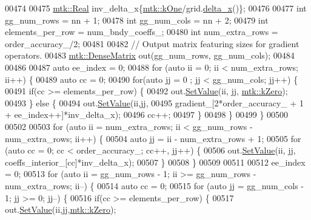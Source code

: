 \begin{DoxyCode}
{{00474 
00475   \hyperlink{group__c01-roots_gac080bbbf5cbb5502c9f00405f894857d}{mtk::Real} inv\_delta\_x\{\hyperlink{group__c01-roots_ga26407c24d43b6b95480943340d285c71}{mtk::kOne}/grid.\hyperlink{classmtk_1_1UniStgGrid1D_a6e7173b01241632cf509496d66b9f74c}{delta\_x}()\};
00476 
00477   \textcolor{keywordtype}{int} gg\_num\_rows = nn + 1;
00478   \textcolor{keywordtype}{int} gg\_num\_cols = nn + 2;
00479   \textcolor{keywordtype}{int} elements\_per\_row = num\_bndy\_coeffs\_;
00480   \textcolor{keywordtype}{int} num\_extra\_rows = order\_accuracy\_/2;
00481 
00482   \textcolor{comment}{// Output matrix featuring sizes for gradient operators.}
00483   \hyperlink{classmtk_1_1DenseMatrix}{mtk::DenseMatrix} out(gg\_num\_rows, gg\_num\_cols);
00484 
00486 
00487   \textcolor{keyword}{auto} ee\_index = 0;
00488   \textcolor{keywordflow}{for} (\textcolor{keyword}{auto} ii = 0; ii < num\_extra\_rows; ii++) \{
00489     \textcolor{keyword}{auto} cc = 0;
00490     \textcolor{keywordflow}{for}(\textcolor{keyword}{auto} jj = 0 ; jj < gg\_num\_cols; jj++) \{
00491       \textcolor{keywordflow}{if}(cc >= elements\_per\_row) \{
00492         out.\hyperlink{classmtk_1_1DenseMatrix_a784ce5784109ac86bfb9d8562b334b13}{SetValue}(ii, jj, \hyperlink{group__c01-roots_ga59a451a5fae30d59649bcda274fea271}{mtk::kZero});
00493       \} \textcolor{keywordflow}{else} \{
00494         out.\hyperlink{classmtk_1_1DenseMatrix_a784ce5784109ac86bfb9d8562b334b13}{SetValue}(ii,jj,
00495                      gradient\_[2*order\_accuracy\_ + 1 + ee\_index++]*inv\_delta\_x);
00496         cc++;
00497       \}
00498     \}
00499   \}
00500 
00502 
00503   \textcolor{keywordflow}{for} (\textcolor{keyword}{auto} ii = num\_extra\_rows; ii < gg\_num\_rows - num\_extra\_rows; ii++) \{
00504     \textcolor{keyword}{auto} jj = ii - num\_extra\_rows + 1;
00505     \textcolor{keywordflow}{for} (\textcolor{keyword}{auto} cc = 0; cc < order\_accuracy\_; cc++, jj++) \{
00506       out.\hyperlink{classmtk_1_1DenseMatrix_a784ce5784109ac86bfb9d8562b334b13}{SetValue}(ii, jj, coeffs\_interior\_[cc]*inv\_delta\_x);
00507     \}
00508   \}
00509 
00511 
00512   ee\_index = 0;
00513   \textcolor{keywordflow}{for} (\textcolor{keyword}{auto} ii = gg\_num\_rows - 1; ii >= gg\_num\_rows - num\_extra\_rows; ii--) \{
00514     \textcolor{keyword}{auto} cc = 0;
00515     \textcolor{keywordflow}{for} (\textcolor{keyword}{auto} jj = gg\_num\_cols - 1; jj >= 0; jj--) \{
00516       \textcolor{keywordflow}{if}(cc >= elements\_per\_row) \{
00517         out.\hyperlink{classmtk_1_1DenseMatrix_a784ce5784109ac86bfb9d8562b334b13}{SetValue}(ii,jj,\hyperlink{group__c01-roots_ga59a451a5fae30d59649bcda274fea271}{mtk::kZero});
}}
\end{DoxyCode}
